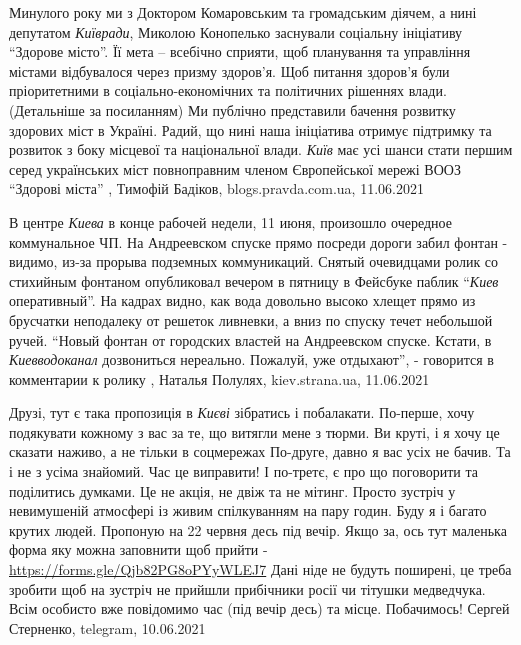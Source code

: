 Минулого року ми з Доктором Комаровським та громадським діячем, а нині
депутатом \emph{Київради}, Миколою Конопелько заснували соціальну ініціативу \enquote{Здорове
місто}. Її мета – всебічно сприяти, щоб планування та управління містами
відбувалося через призму здоров'я. Щоб питання здоров'я були пріоритетними в
соціально-економічних та політичних рішеннях влади. (Детальніше за посиланням)
Ми публічно представили бачення розвитку здорових міст в Україні. Радий, що
нині наша ініціатива отримує підтримку та розвиток з боку місцевої та
національної влади. \emph{Київ} має усі шанси стати першим серед українських міст
повноправним членом Європейської мережі ВООЗ \enquote{Здорові міста}
, Тимофій Бадіков, blogs.pravda.com.ua, 11.06.2021

В центре \emph{Киева} в конце рабочей недели, 11 июня, произошло очередное
коммунальное ЧП. На Андреевском спуске прямо посреди дороги забил фонтан -
видимо, из-за прорыва подземных коммуникаций.  Снятый очевидцами ролик со
стихийным фонтаном опубликовал вечером в пятницу в Фейсбуке паблик \enquote{\emph{Киев}
оперативный}.  На кадрах видно, как вода довольно высоко хлещет прямо из
брусчатки неподалеку от решеток ливневки, а вниз по спуску течет небольшой
ручей.  \enquote{Новый фонтан от городских властей на Андреевском спуске. Кстати, в
\emph{Киевводоканал} дозвониться нереально. Пожалуй, уже отдыхают}, - говорится в
комментарии к ролику
, Наталья Полулях, kiev.strana.ua, 11.06.2021

Друзі, тут є така пропозиція в \emph{Києві} зібратись і побалакати.  По-перше,
хочу подякувати кожному з вас за те, що витягли мене з тюрми. Ви круті, і я
хочу це сказати наживо, а не тільки в соцмережах По-друге, давно я вас усіх не
бачив.  Та і не з усіма знайомий. Час це виправити!  І по-третє, є про що
поговорити та поділитись думками. Це не акція, не двіж та не мітинг. Просто
зустріч у невимушеній атмосфері із живим спілкуванням на пару годин. Буду я і
багато крутих людей.  Пропоную на 22 червня десь під вечір.  Якщо за, ось тут
маленька форма яку можна заповнити щоб прийти -
\url{https://forms.gle/Qjb82PG8oPYyWLEJ7} Дані ніде не будуть поширені, це
треба зробити щоб на зустріч не прийшли прибічники росії чи тітушки медведчука.
Всім особисто вже повідомимо час (під вечір десь) та місце. Побачимось!
Сергей Стерненко, telegram, 10.06.2021

